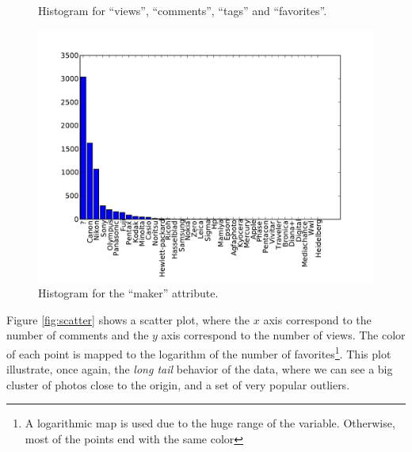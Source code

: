 \documentclass[letter,12pt]{article}
\begin{document}
\begin{figure}[!h]
{}
\caption{Histogram for ``views'', ``comments'', ``tags'' and ``favorites''.}
\label{fig:histo_numerical}
\end{figure}

\begin{figure}[!h]
\centering
\includegraphics[scale=0.6]{histo_make.pdf}
\caption{Histogram for the ``maker'' attribute.}
\label{fig:histo_make}
\end{figure}

Figure \ref{fig:scatter} shows a scatter plot, where the $x$ axis correspond to the number of comments and the $y$ axis correspond to the number of views. The color of each point is mapped to the logarithm of the number of favorites\footnote{A logarithmic map is used due to the huge range of the variable. Otherwise, most of the points end with the same color}. This plot illustrate, once again, the \emph{long tail} behavior of the data, where we can see a big cluster of photos close to the origin, and a set of very popular outliers.
\end{document}
